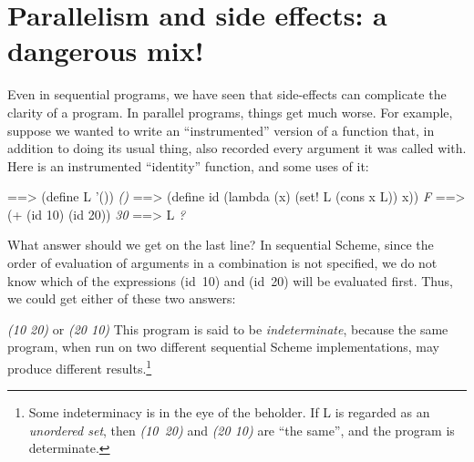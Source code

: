 
\section{Parallelism and side effects: a dangerous mix!}

\label{side-effects}

Even in sequential programs, we have seen that side-effects can complicate
the clarity of a program.  In parallel programs, things get much worse.  For
example, suppose we wanted to write an ``instrumented'' version of a function
that, in addition to doing its usual thing, also recorded every argument it
was called with.  Here is an instrumented ``identity'' function, and some
uses of it:

\beginlisp
==> (define L '())
{\em ()}
\null
==> (define id (lambda (x)
       (set! L (cons x L))
       x))
{\em F}
\null
==> (+ (id 10) (id 20))
{\em 30}
\null
==> L
{\em ?}
\endlisp

What answer should we get on the last line? In sequential Scheme,
since the order of evaluation of arguments in a combination is not
specified, we do not know which of the expressions
\mbox{\cf (id 10)} and \mbox{\cf (id 20)} will be evaluated first.  Thus, we
could get either of these two answers:

\beginlisp
{\em (10 20)}        {\rm or}        {\em (20 10)}
\endlisp
 This program is said to be {\em indeterminate\/}, because the same program,
when run on two different sequential Scheme implementations, may produce
different results.\footnote{
 Some indeterminacy is in the eye of the
beholder.  If {\cf L} is regarded as an {\em unordered set\/}, then
\mbox{\em (10 20)} and {\em (20 10)} are ``the same'', and the program is determinate. }

